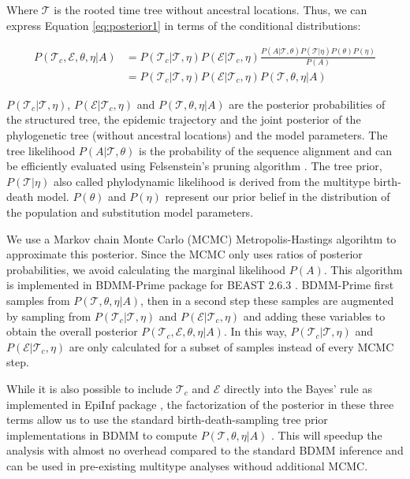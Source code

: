 Where $\mathcal{T}$ is the rooted time tree without ancestral locations. Thus, we can express Equation \ref{eq:posterior1} in terms of the conditional distributions:

\begin{align}
P(\mathcal{T}_c, \mathcal{E}, \theta, \eta | A) &= P(\mathcal{T}_c|\mathcal{T}, \eta) P(\mathcal{E}|\mathcal{T}_c, \eta) \frac{P(A | \mathcal{T}, \theta) P(\mathcal{T} | \eta) P(\theta) P(\eta)}{P(A)}\\
&= P(\mathcal{T}_c|\mathcal{T}, \eta) P(\mathcal{E}|\mathcal{T}_c, \eta) P(\mathcal{T}, \theta, \eta | A)
\label{eq:posterior2}
\end{align}

$P(\mathcal{T}_c|\mathcal{T}, \eta)$, $P(\mathcal{E}|\mathcal{T}_c, \eta)$ and $P(\mathcal{T}, \theta, \eta | A)$ are the posterior probabilities of the structured tree, the epidemic trajectory and the joint posterior of the phylogenetic tree (without ancestral locations) and the model parameters. The tree likelihood $P(A | \mathcal{T},\theta )$ is the probability of the sequence alignment and can be efficiently evaluated using Felsenstein’s pruning algorithm \cite{Felsenstein1981}. The tree prior, $P(\mathcal{T} | \eta)$ also called phylodynamic likelihood is derived from the multitype birth-death model. $P(\theta)$ and $P(\eta)$ represent our prior belief in the distribution of the population and substitution model parameters. 

We use a Markov chain Monte Carlo (MCMC) Metropolis-Hastings algorihtm to approximate this posterior. Since the MCMC only uses ratios of posterior probabilities, we avoid calculating the marginal likelihood $P(A)$. This algorithm is implemented in BDMM-Prime package \cite{bdmmp} for BEAST 2.6.3 \cite{Bouckaert2019}. BDMM-Prime first samples from $P(\mathcal{T}, \theta, \eta | A)$, then in a second step these samples are augmented by sampling from $P(\mathcal{T}_c|\mathcal{T}, \eta)$ and $P(\mathcal{E}|\mathcal{T}_c, \eta) $ and adding these variables to obtain the overall posterior $P(\mathcal{T}_c, \mathcal{E}, \theta, \eta | A)$. In this way, $P(\mathcal{T}_c|\mathcal{T}, \eta)$ and $P(\mathcal{E}|\mathcal{T}_c, \eta) $  are only calculated for a subset of samples instead of every MCMC step.


While it is also possible to include $\mathcal{T}_c$ and $\mathcal{E}$ directly into the Bayes' rule as implemented in EpiInf package \cite{Vaughan2019}, the factorization of the posterior in these three terms allow us to use the standard birth-death-sampling tree prior implementations in BDMM to compute $P(\mathcal{T}, \theta, \eta | A)$ \cite{Kuhnert2016} \cite{Scire2020}. This will speedup the analysis with almost no overhead compared to the standard BDMM inference and can be used in pre-existing multitype analyses withoud additional MCMC.\\

